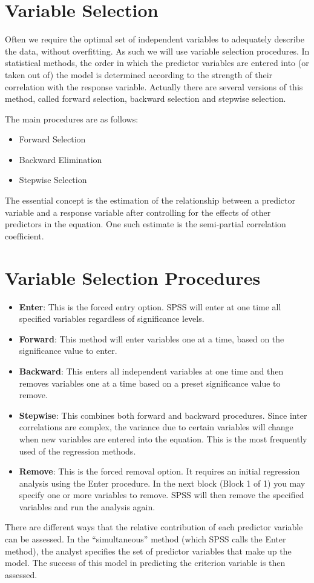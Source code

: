 \documentclass[a4paper,12pt]{article}
\begin{document}
\section{Variable Selection}
Often we require the optimal set of independent variables to adequately describe the data, without overfitting. As such we will use variable selection procedures. In statistical methods, the order in which the predictor variables are entered into (or taken out of) the model is determined according to the strength of their correlation with the response variable. Actually there are several versions of this method, called forward selection, backward selection and stepwise selection.

The main procedures are as follows:
\begin{itemize}
	\item Forward Selection
	\item Backward Elimination
	\item Stepwise Selection
\end{itemize}

The essential concept is the estimation of the relationship between a predictor
variable and a response variable after controlling for the effects of other
predictors in the equation. One such estimate is the semi-partial correlation coefficient.


\section{Variable Selection Procedures}

\begin{itemize}
\item \textbf{Enter}: This is the forced entry option. SPSS will enter at one time all specified variables regardless of significance levels.
\item \textbf{Forward}: This method will enter variables one at a time, based on the significance value to enter.
\item \textbf{Backward}: This enters all independent variables at one time and then removes variables one at a time based on a preset significance value to remove.
\item \textbf{Stepwise}: This combines both forward and backward procedures. Since inter correlations are complex, the variance due to certain variables will change when new variables are entered into the equation. This is the most frequently used of the regression methods.
\item \textbf{Remove}: This is the forced removal option. It requires an initial regression analysis using the Enter procedure. In the next block (Block 1 of 1) you may specify one or more variables to remove. SPSS will then remove the specified variables and run the analysis again.
\end{itemize}
There are different ways that the relative contribution of each predictor variable can be assessed. In the “simultaneous” method (which SPSS calls the Enter method), the analyst specifies the set of predictor variables that make up the model. The success of this model in predicting the criterion variable is then assessed.
\end{document}
